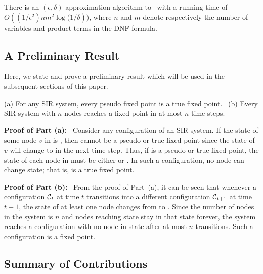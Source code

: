 \begin{theorem}\label{thm:num_dnf_prob_approx}
There is an $(\epsilon, \delta)$-approximation algorithm to~ \dnfsat{} 
with a running time of\\ $O((1/\epsilon^2)nm^2\log{(1/\delta}))$,
where $n$ and $m$ denote respectively the number of variables
and product terms in the DNF formula. \QED
\end{theorem}

\subsection{A Preliminary Result} 
\label{sse:prelim}

Here, we state and prove a preliminary result which will be used
in the subsequent sections of this paper.

\begin{proposition}\label{pro:sir_fixed_point}
(a) For any SIR system, every pseudo fixed point is a true fixed point.~
(b) Every SIR system with $n$ nodes reaches a fixed point 
in at most $n$ time steps.
\end{proposition}

\noindent
\textbf{Proof of Part (a):}~ Consider any configuration \calc{} of an SIR
system.
If the state of some node $v$ in \calc{} is \istate, then \calc{}
cannot be a pseudo or true fixed point since the state of $v$ will change 
to \rstate{} in the next time step.
Thus, if \calc{} is a pseudo or true fixed point, the state of each
node in \calc{} must be either \sstate{} or \rstate.
In such a configuration, no node can change state; 
that is, \calc{} is a true fixed point.

\smallskip
\noindent
\textbf{Proof of Part (b):}~
From the proof of Part~(a), 
it can be seen that whenever a configuration $\mbox{${\cal C}$}_t$ at time $t$ 
transitions into 
a different configuration $\mbox{${\cal C}$}_{t+1}$ at time $t+1$, the state 
of at least one node changes from \istate{} to \rstate. 
Since the number of nodes in the system is $n$ and nodes 
reaching state \rstate{} stay in that state forever, 
the system reaches a configuration with no node in state \istate{} 
after at most $n$ transitions. 
Such a configuration is a fixed point. \QED

\subsection{Summary of Contributions}
\label{sse:results_summary}

